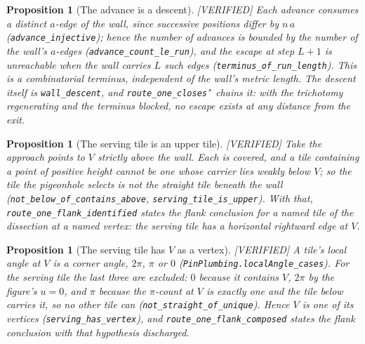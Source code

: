 \documentclass[11pt,reqno]{amsart}
\theoremstyle{plain}
\newtheorem{proposition}[theorem]{Proposition}
\theoremstyle{definition}
\newcommand{\lab}[1]{\hfill\textnormal{\footnotesize\textsc{[#1]}}}
\begin{document}
\begin{proposition}[The advance is a descent]\label{prop:descent}\lab{VERIFIED}
Each advance consumes a distinct $a$-edge of the wall, since successive positions differ by $n\,a$
(\texttt{advance\_injective}); hence the number of advances is bounded by the number of the wall's
$a$-edges (\texttt{advance\_count\_le\_run}), and the escape at step $L+1$ is unreachable when the
wall carries $L$ such edges (\texttt{terminus\_of\_run\_length}). This is a combinatorial terminus,
independent of the wall's metric length. The descent itself is \texttt{wall\_descent}, and
\texttt{route\_one\_closes'} chains it: with the trichotomy regenerating and the terminus blocked, no
escape exists at any distance from the exit.
\end{proposition}

\begin{proposition}[The serving tile is an upper tile]\label{prop:serving}\lab{VERIFIED}
Take the approach points to $V$ \emph{strictly above} the wall. Each is covered, and a tile
containing a point of positive height cannot be one whose carrier lies weakly below $V$; so the
tile the pigeonhole selects is not the straight tile beneath the wall
(\texttt{not\_below\_of\_contains\_above}, \texttt{serving\_tile\_is\_upper}). With that,
\texttt{route\_one\_flank\_identified} states the flank conclusion for a named tile of the
dissection at a named vertex: the serving tile has a horizontal rightward edge at $V$.
\end{proposition}

\begin{proposition}[The serving tile has $V$ as a vertex]\label{prop:servingvertex}\lab{VERIFIED}
A tile's local angle at $V$ is a corner angle, $2\pi$, $\pi$ or $0$
(\texttt{PinPlumbing.localAngle\_cases}). For the serving tile the last three are excluded: $0$
because it contains $V$, $2\pi$ by the figure's $u=0$, and $\pi$ because the $\pi$-count at $V$ is
exactly one and the tile below carries it, so no other tile can
(\texttt{not\_straight\_of\_unique}). Hence $V$ is one of its vertices
(\texttt{serving\_has\_vertex}), and \texttt{route\_one\_flank\_composed} states the flank
conclusion with that hypothesis discharged.
\end{proposition}
\end{document}

